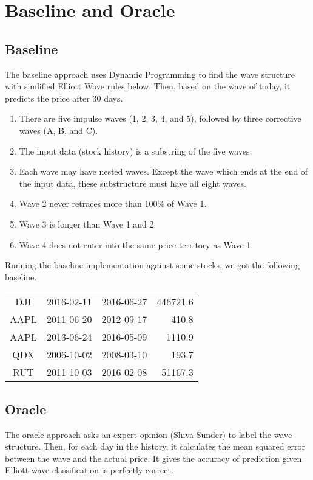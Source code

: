\documentclass[12pt]{article}
\begin{document}
\section{Baseline and Oracle}

\subsection{Baseline}

The baseline approach uses Dynamic Programming to find the wave
structure with simlified Elliott Wave rules below. Then, based on the
wave of today, it predicts the price after 30 days.

\begin{enumerate}
 \item There are five impulse waves (1, 2, 3, 4, and 5), followed by
   three corrective waves (A, B, and C).
 \item The input data (stock history) is a substring of the five waves.
 \item Each wave may have nested waves. Except the wave which ends at the end of the input data, these substructure must have all eight waves.
 \item Wave 2 never retraces more than 100\% of Wave 1.
 \item Wave 3 is longer than Wave 1 and 2. 
 \item Wave 4 does not enter into the same price territory as Wave 1.
\end{enumerate}

Running the baseline implementation against some stocks, we got the following baseline.

\begin{tabular}{cccr}
DJI & 2016-02-11 & 2016-06-27 & 446721.6  \\
AAPL & 2011-06-20 & 2012-09-17 & 410.8 \\
AAPL & 2013-06-24 & 2016-05-09 & 1110.9 \\
QDX  & 2006-10-02 & 2008-03-10 & 193.7 \\
RUT  & 2011-10-03 & 2016-02-08 & 51167.3 \\
\end{tabular}

\subsection{Oracle}

The oracle approach asks an expert opinion (Shiva Sunder) to label the
wave structure. Then, for each day in the history, it calculates the
mean squared error between the wave and the actual price. It gives the
accuracy of prediction given Elliott wave classification is perfectly
correct.
\end{document}
